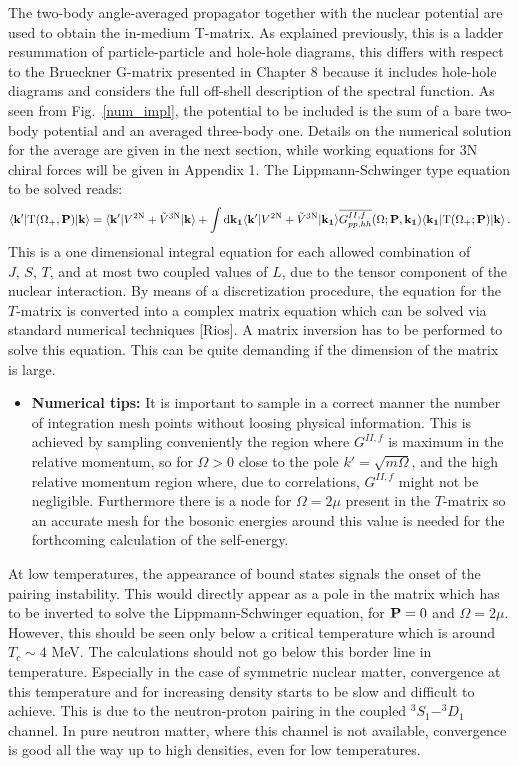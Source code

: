  The two-body angle-averaged propagator together with the nuclear potential are used to obtain the in-medium T-matrix. As explained previously, this is a ladder resummation of particle-particle and hole-hole diagrams, this differs with respect to the Brueckner G-matrix presented in Chapter 8 because it includes hole-hole diagrams and considers the full off-shell description of the spectral function. As seen from Fig.~\ref{num_impl}, the potential to be included is the sum of a bare two-body potential and an averaged three-body one. Details on the numerical solution for the average are given in the next section, while working equations for 3N chiral forces will be given in Appendix 1. The Lippmann-Schwinger type equation to be solved reads:
\begin{equation}
\label{t-matrix}
\langle{\bf k'}|{\rm T}(\Omega_+,{\bf P})|{\bf k}\rangle=\langle{\bf k'}|V^{\rm 2N}+\tilde V^{\rm 3N}|{\bf k}\rangle+\int {\rm d}{\bf k_1}\langle{\bf k'}|V^{\rm 2N}+\tilde V^{\rm 3N}|{\bf k_1}\rangle\overline{G^{II,f}_{pp,hh}}(\Omega;{\bf P},{\bf k_1})\langle{\bf k_1}|{\rm T}(\Omega_+;{\bf P})|{\bf k}\rangle\,.
\end{equation}
This is a one dimensional integral equation for each allowed combination of $J,\,S,\,T$, and at most two coupled values of $L$, due to the tensor component of the nuclear interaction. By means of a discretization procedure, the equation for the $T$-matrix is converted into a complex matrix equation which can be solved via standard numerical techniques [Rios]. A matrix inversion has to be performed to solve this equation. This can be quite demanding if the dimension of the matrix is large. 
\begin{itemize}
\item {\bf Numerical tips:} It is important to sample in a correct manner the number of integration mesh points without loosing physical information. This is achieved by sampling conveniently the region where $G^{II,f}$ is maximum in the relative momentum, so for $\Omega>0$ close to the pole $k'=\sqrt{m\Omega}$, and the high relative momentum region where, due to correlations, $G^{II,f}$ might not be negligible. Furthermore there is a node for $\Omega=2\mu$ present in the $T$-matrix so an accurate mesh for the bosonic energies around this value is needed for the forthcoming calculation of the self-energy.
\end{itemize}
At low temperatures, the appearance of bound states signals the onset of the pairing instability. This would directly appear as a pole in the matrix which has to be inverted to solve the Lippmann-Schwinger equation, for ${\bf P}=0$ and $\Omega=2\mu$. However, this should be seen only below a critical temperature which is around $T_c\sim4$ MeV. The calculations should not go below this border line in temperature. Especially in the case of symmetric nuclear matter, convergence at this temperature and for increasing density starts to be slow and difficult to achieve. This is due to the neutron-proton pairing in the coupled $^3S_1-^3D_1$ channel. In pure neutron matter, where this channel is not available, convergence is good all the way up to high densities, even for low temperatures. 


